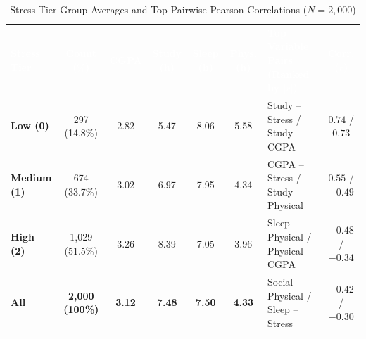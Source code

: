 \documentclass[11pt,a4paper]{article}
\newcommand{\hd}[1]{\textcolor{white}{\textbf{#1}}}
\renewcommand{\arraystretch}{1.04}
\begin{document}
\begin{table}[!htbp]
\centering
\caption{Stress-Tier Group Averages and Top Pairwise Pearson Correlations ($N = 2,000$)}
\label{tab:stress_corr}
\footnotesize
\renewcommand{\arraystretch}{1.08}
\setlength{\tabcolsep}{5pt}
\begin{tabularx}{\textwidth}{>{\bfseries}l c c c c c !{\color{accent}\vrule width 0.8pt} >{\raggedright\arraybackslash}X c}
\toprule[1.2pt]
\hd{Stress Tier} & \hd{Count ($\%$)} & \hd{CGPA} & \hd{Study (h)} & \hd{Sleep (h)} & \hd{Phys. (h)} & \hd{Top Variable Pairs (Ranked by $|r|$)} & \hd{Corr. ($r$)} \\
\midrule
Low (0)      & 297 (14.8\%)   & 2.82 & 5.47 & 8.06 & 5.58 & Study -- Stress / Study -- CGPA & $0.74$ / $0.73$ \\
Medium (1)   & 674 (33.7\%)   & 3.02 & 6.97 & 7.95 & 4.34 & CGPA -- Stress / Study -- Physical & $0.55$ / $-0.49$ \\
High (2)     & 1,029 (51.5\%) & 3.26 & 8.39 & 7.05 & 3.96 & Sleep -- Physical / Physical -- CGPA & $-0.48$ / $-0.34$ \\
\midrule
{}
\textbf{All} & \textbf{2,000 (100\%)} & \textbf{3.12} & \textbf{7.48} & \textbf{7.50} & \textbf{4.33} & Social -- Physical / Sleep -- Stress & $-0.42$ / $-0.30$ \\
\bottomrule[1.2pt]
\end{tabularx}
\end{table}
\end{document}
